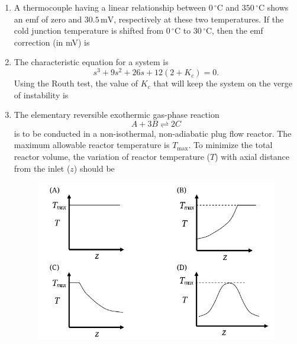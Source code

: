 \documentclass[journal,12pt,onecolumn]{IEEEtran}
\theoremstyle{remark}
\begin{document}
\begin{enumerate}
\item A thermocouple having a linear relationship between $0 \, ^\circ\text{C}$ and $350 \, ^\circ\text{C}$ shows an emf of zero and $30.5 \, \text{mV}$, respectively at these two temperatures. If the cold junction temperature is shifted from $0 \, ^\circ\text{C}$ to $30 \, ^\circ\text{C}$, then the emf correction (in mV) is
\hfill{}
\begin{enumerate}
\end{enumerate}

\item The characteristic equation for a system is
\[s^3 + 9s^2 + 26s + 12(2 + K_c) = 0.\]
Using the Routh test, the value of $K_c$ that will keep the system on the verge of instability is
\hfill{}
\begin{enumerate}
\end{enumerate}

\item The elementary reversible exothermic gas-phase reaction
\[A + 3B \rightleftharpoons 2C\]
is to be conducted in a non-isothermal, non-adiabatic plug flow reactor. The maximum allowable reactor temperature is $T_{\text{max}}$. To minimize the total reactor volume, the variation of reactor temperature ($T$) with axial distance from the inlet ($z$) should be
\hfill{}
\begin{figure}[H]
    \centering
    \includegraphics[width=0.65\columnwidth]{figs/qn 41.jpg}
    \caption{}
    \label{fig:qn41.jpg}
\end{figure}


\end{enumerate}
\end{document}
